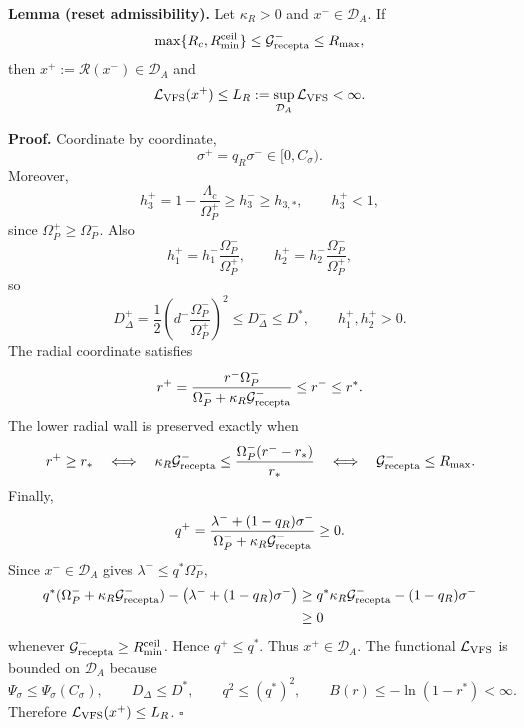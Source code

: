 \documentclass[11pt,a4paper]{article}
\newcommand{\DA}{\mathcal D_A}
\newcommand{\LV}{\mathcal L_{\rm VFS}}
\newcommand{\Rcal}{\mathcal R}
\newcommand{\Grec}{\mathcal G_{\rm recepta}}
\newcommand{\Om}{\Omega_P}
\theoremstyle{remark}
\begin{document}
\textbf{Lemma (reset admissibility).}
Let $\kappa_R>0$ and $x^-\in\DA$. If
\begin{equation}
  \max\{R_c,R_{\min}^{\rm ceil}\}\le\Grec^-\le R_{\max},
\end{equation}
then $x^+:=\Rcal(x^-)\in\DA$ and
\begin{equation}
  \LV(x^+)\le L_R:=\sup_{\DA}\LV<\infty.
\end{equation}

\textbf{Proof.} Coordinate by coordinate,
\begin{equation}
  \sigma^+=q_R\sigma^-\in[0,C_\sigma).
\end{equation}
Moreover,
\begin{equation}
  h_3^+=1-\frac{\Lambda_c}{\Om^+}
  \ge h_3^-\ge h_{3,*},
  \qquad
  h_3^+<1,
\end{equation}
since $\Om^+\ge\Om^-$. Also
\begin{equation}
  h_1^+=h_1^-\frac{\Om^-}{\Om^+},
  \qquad
  h_2^+=h_2^-\frac{\Om^-}{\Om^+},
\end{equation}
so
\begin{equation}
  D_\Delta^+=\frac12\left(d^-\frac{\Om^-}{\Om^+}\right)^2
  \le D_\Delta^-\le D^*,
  \qquad
  h_1^+,h_2^+>0.
\end{equation}
The radial coordinate satisfies
\begin{equation}
  r^+=\frac{r^-\Om^-}{\Om^-+\kappa_R\Grec^-}
  \le r^-\le r^*.
\end{equation}
The lower radial wall is preserved exactly when
\begin{equation}
  r^+\ge r_*
  \quad\Longleftrightarrow\quad
  \kappa_R\Grec^-\le\frac{\Om^-(r^--r_*)}{r_*}
  \quad\Longleftrightarrow\quad
  \Grec^-\le R_{\max}.
\end{equation}
Finally,
\begin{equation}
  q^+=
  \frac{\lambda^-+(1-q_R)\sigma^-}{\Om^-+\kappa_R\Grec^-}
  \ge0.
\end{equation}
Since $x^-\in\DA$ gives $\lambda^-\le q^*\Om^-$,
\begin{equation}
\begin{aligned}
  q^*(\Om^-+\kappa_R\Grec^-)
  -\bigl(\lambda^-+(1-q_R)\sigma^-\bigr)
  &\ge
  q^*\kappa_R\Grec^--(1-q_R)\sigma^-\\
  &\ge0
\end{aligned}
\end{equation}
whenever $\Grec^-\ge R_{\min}^{\rm ceil}$. Hence $q^+\le q^*$.
Thus $x^+\in\DA$. The functional $\LV$ is bounded on $\DA$ because
\begin{equation}
  \Psi_\sigma\le\Psi_\sigma(C_\sigma),
  \qquad
  D_\Delta\le D^*,
  \qquad
  q^2\le(q^*)^2,
  \qquad
  B(r)\le-\ln(1-r^*)<\infty.
\end{equation}
Therefore $\LV(x^+)\le L_R$. \hfill$\square$
\end{document}
